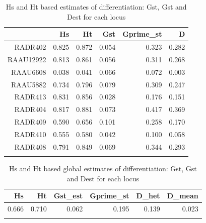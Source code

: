 \documentclass[a4paper]{scrartcl}\usepackage[]{graphicx}\usepackage[]{color}
\begin{document}
\begin{table}[ht]
\centering
\begin{tabular}{rrrrrr}
  \hline
 & Hs & Ht & Gst & Gprime\_st & D \\ 
  \hline
RADR402 & 0.825 & 0.872 & 0.054 & 0.323 & 0.282 \\ 
   \rowcolor[gray]{0.9} RAAU12922 & 0.813 & 0.861 & 0.056 & 0.311 & 0.268 \\ 
  RAAU6608 & 0.038 & 0.041 & 0.066 & 0.072 & 0.003 \\ 
   \rowcolor[gray]{0.9} RAAU5882 & 0.734 & 0.796 & 0.079 & 0.309 & 0.247 \\ 
  RADR413 & 0.831 & 0.856 & 0.028 & 0.176 & 0.151 \\ 
   \rowcolor[gray]{0.9} RADR404 & 0.817 & 0.881 & 0.073 & 0.417 & 0.369 \\ 
  RADR409 & 0.590 & 0.656 & 0.101 & 0.258 & 0.170 \\ 
   \rowcolor[gray]{0.9} RADR410 & 0.555 & 0.580 & 0.042 & 0.100 & 0.058 \\ 
  RADR408 & 0.791 & 0.849 & 0.069 & 0.344 & 0.293 \\ 
   \rowcolor[gray]{0.9}  \hline
\end{tabular}
\caption{Hs and Ht based estimates of differentiation: Gst, Gst and Dest for each locus} 
\end{table}
\begin{table}[ht]
\centering
\begin{tabular}{rrrrrr}
  \hline
Hs & Ht & Gst\_est & Gprime\_st & D\_het & D\_mean \\ 
  \hline
0.666 & 0.710 & 0.062 & 0.195 & 0.139 & 0.023 \\ 
   \rowcolor[gray]{0.9}  \hline
\end{tabular}
\caption{Hs and Ht based global estimates of differentiation: Gst, Gst and Dest for each locus} 
\end{table}
\end{document}
